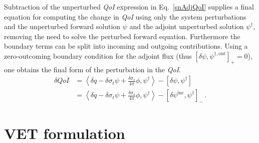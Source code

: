 \documentclass{article}
\newcommand{\bra}{\left\langle}
\newcommand{\ket}{\right\rangle}
\newcommand{\sbra}{\left[}
\newcommand{\sket}{\right]}
\newcommand{\sigt}{\sigma_t}
\newcommand{\sigs}{\sigma_s}
\newcommand{\scalSource}{q}
\newcommand{\qoi}{{\it QoI}\xspace}
\begin{document}
Subtraction of the unperturbed \qoi expression in Eq.~\eqref{snAdjQoI} supplies a final equation for computing the change in \qoi using only the system perturbations and the unperturbed forward solution $\psi$ and the adjoint unperturbed
solution $\psi^\dag$, removing the need to solve the perturbed forward equation. 
Furthermore the boundary terms can be split into incoming and outgoing contributions.
Using a zero-outcoming  boundary condition for the adjoint flux
(thus $\sbra \delta \psi, \psi^{\dag,\text{out}} \sket_+=0$), one obtains the final 
form of the perturbation in the \qoi.
\begin{equation}
\label{snSens}
\begin{split}
\delta QoI &= \bra \delta \scalSource - \delta \sigt \psi + \frac{\delta\sigs}{4 \pi} \phi  , \psi^\dag  \ket - \sbra \delta \psi, \psi^\dag \sket \\
&= \bra \delta \scalSource - \delta \sigt \psi + \frac{\delta\sigs}{4 \pi} \phi , \psi^\dag  \ket - \sbra \delta \psi^{\text{inc}}, \psi^\dag \sket_- \,.
\end{split}
\end{equation}

\section{VET formulation}

\end{document}
